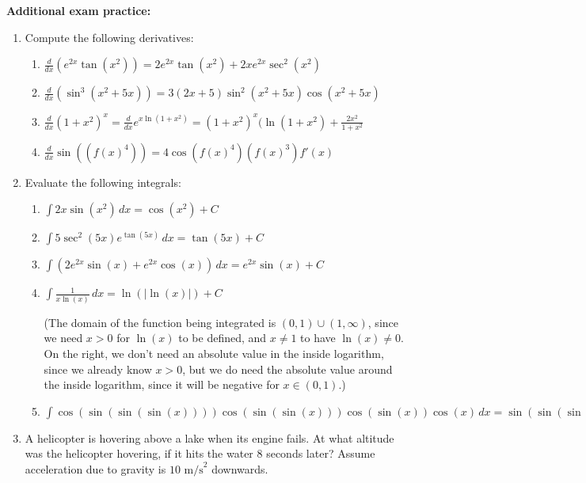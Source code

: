\documentclass[12pt]{article}
\newcommand{\di}{\displaystyle}
\newcommand{\abs}[1]{\lvert #1\rvert}
\begin{document}
\textbf{Additional exam practice:}
\begin{enumerate}
\item Compute the following derivatives:
\begin{enumerate}
\item $\di\frac{d}{dx}(e^{2x}\tan(x^2)) = 2e^{2x}\tan(x^2)+2xe^{2x}\sec^2(x^2)$



\item $\di\frac{d}{dx}(\sin^3(x^2+5x))=3(2x+5)\sin^2(x^2+5x)\cos(x^2+5x)$

\item $\di\frac{d}{dx}(1+x^2)^x = \frac{d}{dx}e^{x\ln(1+x^2)}=(1+x^2)^x(\ln(1+x^2)+\frac{2x^2}{1+x^2}$

\item $\di \frac{d}{dx}\sin((f(x)^4))=4\cos(f(x)^4)(f(x)^3)f'(x)$

\end{enumerate}

\item Evaluate the following integrals:

\begin{enumerate}
\item $\di \int 2x\sin(x^2)\,dx=\cos(x^2)+C$


\item $\di \int 5\sec^2(5x)e^{\tan(5x)}\,dx=\tan(5x)+C$

\item $\di \int (2e^{2x}\sin(x)+e^{2x}\cos(x))\,dx=e^{2x}\sin(x)+C$

\item $\di \int \frac{1}{x\ln(x)}\,dx=\ln(\abs{\ln(x)})+C$

(The domain of the function being integrated is $(0,1)\cup (1,\infty)$, since we need $x>0$ for $\ln(x)$ to be defined, and $x\neq 1$ to have $\ln(x)\neq 0$. On the right, we don't need an absolute value in the inside logarithm, since we already know $x>0$, but we do need the absolute value around the inside logarithm, since it will be negative for $x\in (0,1)$.)
\item $\di \int \cos(\sin(\sin(\sin(x))))\cos(\sin(\sin(x)))\cos(\sin(x))\cos(x)\,dx = \sin(\sin(\sin(\sin(x))))+C$
\end{enumerate}


\item A helicopter is hovering above a lake when its engine fails. At what altitude was the helicopter hovering, if it hits the water 8 seconds later? Assume acceleration due to gravity is $10 \text{ m/s}^2$ downwards.


\end{enumerate}
\end{document}
